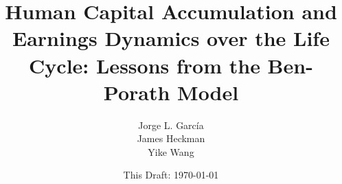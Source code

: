 \documentclass[12pt]{article}
\begin{document}
\title{Human Capital Accumulation and Earnings Dynamics over the Life Cycle: Lessons from the Ben-Porath Model}
\author{Jorge L. Garc\'{i}a \\ James Heckman \\ Yike Wang}
\date{This Draft: \today}
\maketitle
\clearpage




\clearpage


\end{document}
